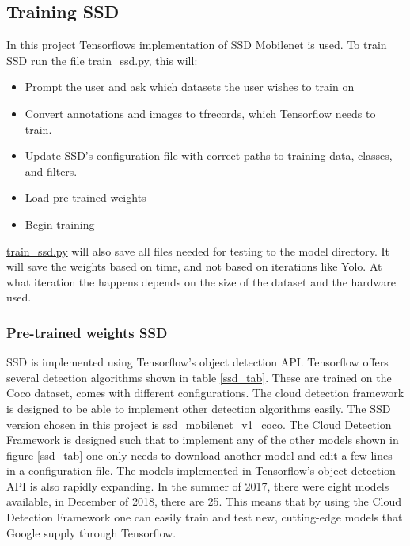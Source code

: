 \newpage

\subsection{Training SSD}
In this project Tensorflows implementation of SSD Mobilenet is used. To train SSD run the file \url{train_ssd.py}, this will:

\begin{itemize}
    \item Prompt the user and ask which datasets the user wishes to train on
    \item Convert annotations and images to tfrecords, which Tensorflow needs to train.
    \item Update SSD's configuration file with correct paths to training data, classes, and filters.
    \item Load pre-trained weights
    \item Begin training
\end{itemize}

\url{train_ssd.py} will also save all files needed for testing to the model directory. It will save the weights based on time, and not based on iterations like Yolo. At what iteration the happens depends on the size of the dataset and the hardware used. 

\subsubsection{Pre-trained weights SSD}
SSD is implemented using Tensorflow's object detection API. Tensorflow offers several detection algorithms shown in table \ref{ssd_tab}. These are trained on the Coco dataset, comes with different configurations. The cloud detection framework is designed to be able to implement other detection algorithms easily. The SSD version chosen in this project is ssd\_mobilenet\_v1\_coco. The Cloud Detection Framework is designed such that to implement any of the other models shown in figure \ref{ssd_tab} one only needs to download another model and edit a few lines in a configuration file. The models implemented in Tensorflow's object detection API is also rapidly expanding. In the summer of 2017, there were eight models available, in December of 2018, there are 25. This means that by using the Cloud Detection Framework one can easily train and test new, cutting-edge models that Google supply through Tensorflow.

